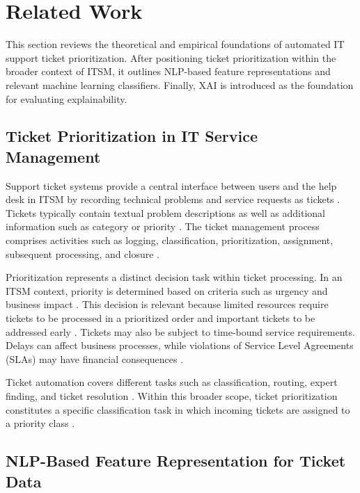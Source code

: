 \section{Related Work}

This section reviews the theoretical and empirical foundations of automated IT support ticket prioritization. After positioning ticket prioritization within the broader context of ITSM, it outlines NLP-based feature representations and relevant machine learning classifiers. Finally, XAI is introduced as the foundation for evaluating explainability.

\subsection{Ticket Prioritization in IT Service Management}

Support ticket systems provide a central interface between users and the help desk in ITSM by recording technical problems and service requests as tickets \cite{alhawari2021helpdesk,fuchs2022support}. Tickets typically contain textual problem descriptions as well as additional information such as category or priority \cite{fuchs2022support,zangari2023ticket}. The ticket management process comprises activities such as logging, classification, prioritization, assignment, subsequent processing, and closure \cite{alhawari2021helpdesk}.

Prioritization represents a distinct decision task within ticket processing. In an ITSM context, priority is determined based on criteria such as urgency and business impact \cite{razma2026classification}. This decision is relevant because limited resources require tickets to be processed in a prioritized order and important tickets to be addressed early \cite{tian2015priority}. Tickets may also be subject to time-bound service requirements. Delays can affect business processes, while violations of Service Level Agreements (SLAs) may have financial consequences \cite{gupta2012scheduling}.

Ticket automation covers different tasks such as classification, routing, expert finding, and ticket resolution \cite{fuchs2022support,zangari2023ticket}. Within this broader scope, ticket prioritization constitutes a specific classification task in which incoming tickets are assigned to a priority class \cite{lyubinets2018labeling,beckers2009multifacet}.

\subsection{NLP-Based Feature Representation for Ticket Data}

